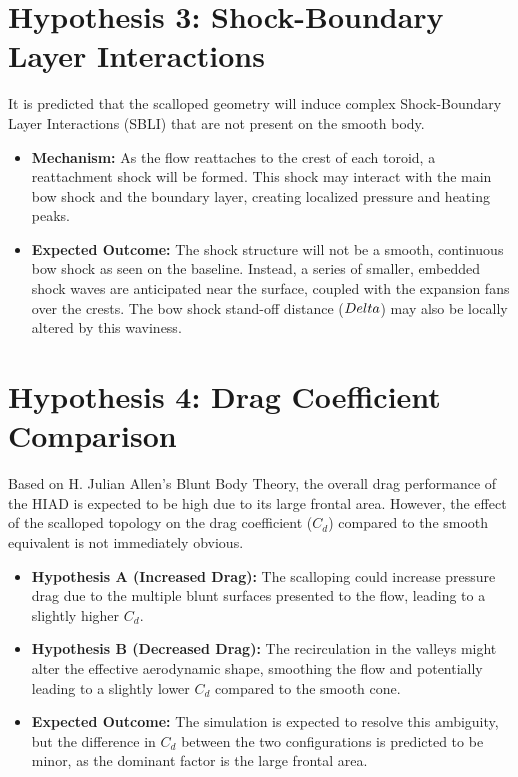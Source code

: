 \section{Hypothesis 3: Shock-Boundary Layer Interactions}
It is predicted that the scalloped geometry will induce complex Shock-Boundary Layer Interactions (SBLI) that are not present on the smooth body.

\begin{itemize}
    \item \textbf{Mechanism:} As the flow reattaches to the crest of each toroid, a reattachment shock will be formed. This shock may interact with the main bow shock and the boundary layer, creating localized pressure and heating peaks.
    \item \textbf{Expected Outcome:} The shock structure will not be a smooth, continuous bow shock as seen on the baseline. Instead, a series of smaller, embedded shock waves are anticipated near the surface, coupled with the expansion fans over the crests. The bow shock stand-off distance ($\\Delta$) may also be locally altered by this waviness.
\end{itemize}

\section{Hypothesis 4: Drag Coefficient Comparison}
Based on H. Julian Allen’s Blunt Body Theory, the overall drag performance of the HIAD is expected to be high due to its large frontal area. However, the effect of the scalloped topology on the drag coefficient ($C_d$) compared to the smooth equivalent is not immediately obvious.

\begin{itemize}
    \item \textbf{Hypothesis A (Increased Drag):} The scalloping could increase pressure drag due to the multiple blunt surfaces presented to the flow, leading to a slightly higher $C_d$.
    \item \textbf{Hypothesis B (Decreased Drag):} The recirculation in the valleys might alter the effective aerodynamic shape, smoothing the flow and potentially leading to a slightly lower $C_d$ compared to the smooth cone.
    \item \textbf{Expected Outcome:} The simulation is expected to resolve this ambiguity, but the difference in $C_d$ between the two configurations is predicted to be minor, as the dominant factor is the large frontal area.
\end{itemize}

